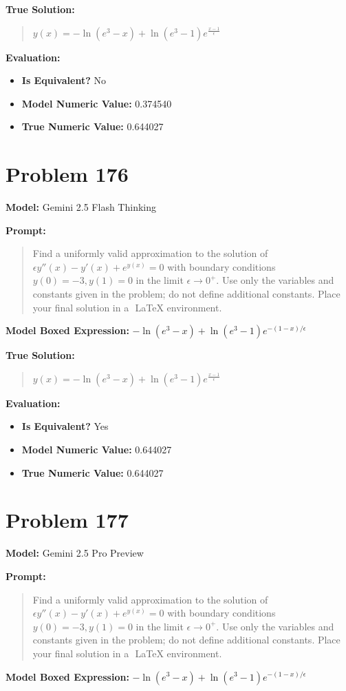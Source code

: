 \documentclass{article}
\begin{document}
{\textbf{True Solution:}
\begin{quote}
$y(x) = -\ln(e^{3}-x) + \ln(e^{3}-1)e^{\frac{x-1}{\epsilon}}$
\end{quote}

\textbf{Evaluation:}
\begin{itemize}
\item \textbf{Is Equivalent?} No
\item \textbf{Model Numeric Value:} 0.374540
\item \textbf{True Numeric Value:} 0.644027
\end{itemize}
\vspace{1cm}
\section*{Problem 176}
\textbf{Model:} Gemini 2.5 Flash Thinking

\textbf{Prompt:}
\begin{quote}
Find a uniformly valid approximation to the solution of $\epsilon y''(x) - y'(x) + e^{y(x)} = 0$ with boundary conditions $y(0) = -3, y(1) = 0$ in the limit $\epsilon \to 0^+$. Use only the variables and constants given in the problem; do not define additional constants. Place your final solution in a $\boxed{}$ LaTeX environment.
\end{quote}
\textbf{Model Boxed Expression:} $-\ln(e^3-x) + \ln(e^3-1)e^{-(1-x)/\epsilon}$

\textbf{True Solution:}
\begin{quote}
$y(x) = -\ln(e^{3}-x) + \ln(e^{3}-1)e^{\frac{x-1}{\epsilon}}$
\end{quote}

\textbf{Evaluation:}
\begin{itemize}
\item \textbf{Is Equivalent?} Yes
\item \textbf{Model Numeric Value:} 0.644027
\item \textbf{True Numeric Value:} 0.644027
\end{itemize}
\vspace{1cm}
\section*{Problem 177}
\textbf{Model:} Gemini 2.5 Pro Preview

\textbf{Prompt:}
\begin{quote}
Find a uniformly valid approximation to the solution of $\epsilon y''(x) - y'(x) + e^{y(x)} = 0$ with boundary conditions $y(0) = -3, y(1) = 0$ in the limit $\epsilon \to 0^+$. Use only the variables and constants given in the problem; do not define additional constants. Place your final solution in a $\boxed{}$ LaTeX environment.
\end{quote}
\textbf{Model Boxed Expression:} $-\ln(e^3-x) + \ln(e^3-1)e^{-(1-x)/\epsilon}$

}
\end{document}
